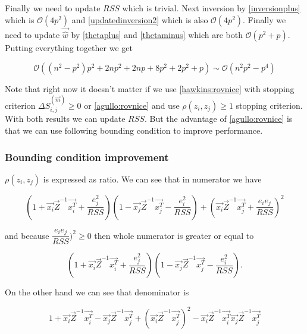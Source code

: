 Finally we need to update $RSS$ which is trivial. Next inversion by \ref{inversionplus} which is $\mathcal{O}(4p^2)$ and \ref{updatedinversion2} which is also $\mathcal{O}(4p^2)$. Finally we need to update $\vec{\hat{w}}$ by \ref{thetaplus} and \ref{thetaminus} which are both $\mathcal{O}(p^2 +p)$. Putting everything together we get

\begin{equation}
	\mathcal{O}( (n^2 - p^2) p^2 + 2np^2 + 2np + 8p^2 + 2p^2 + p) \sim \mathcal{O}(n^2p^2 - p^4) 
\end{equation}


Note that right now it doesn't matter if we use \ref{hawkins:rovnice} with stopping criterion $	\Delta S^{(\vec{m})}_{i,j} \geq 0$  or \ref{agullo:rovnice} and use $\rho(z_i, z_j) \geq 1 $ stopping criterion. With both results we can update $RSS$. But the advantage of \ref{agullo:rovnice} is that we can use following bounding condition to improve performance.


\subsubsection*{Bounding condition improvement}
$\rho(z_i, z_j)$ is expressed as ratio. We can see that in numerator we have

\begin{equation}
	(1+\vec{x_i}\vec{Z}^{-1}\vec{x_i^T} + \dfrac{e_j^2}{RSS})
		(1 - \vec{x_j}\vec{Z}^{-1}\vec{x_j^T} - \dfrac{e_i^2}{RSS} )+
		(\vec{x_i}\vec{Z}^{-1}\vec{x_j^T} + \dfrac{e_i e_j}{RSS} )^2
\end{equation}

and because $ \dfrac{e_i e_j}{RSS} )^2 \geq 0$ then whole numerator is greater or equal to

\begin{equation}
	(1+\vec{x_i}\vec{Z}^{-1}\vec{x_i^T} + \dfrac{e_j^2}{RSS})
(1 - \vec{x_j}\vec{Z}^{-1}\vec{x_j^T} - \dfrac{e_i^2}{RSS} ).
\end{equation}

On the other hand we can see that denominator is

\begin{equation}
	1 + \vec{x_i}\vec{Z}^{-1}\vec{x_i^T}  - \vec{x_j}\vec{Z}^{-1}\vec{x_j^T}  + (\vec{x_i}\vec{Z}^{-1}\vec{x_j^T})^2 -   \vec{x_i}\vec{Z}^{-1}\vec{x_i^T}\vec{x_j}\vec{Z}^{-1}\vec{x_j^T} 
\end{equation}

